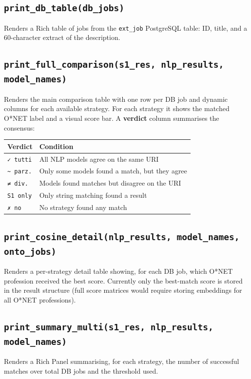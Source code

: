 ﻿\documentclass[12pt,a4paper]{article}
\begin{document}
\subsection{\texttt{print\_db\_table(db\_jobs)}}
Renders a Rich table of jobs from the \texttt{ext\_job} PostgreSQL table: ID, title, and a 60-character extract of the description.

\subsection{\texttt{print\_full\_comparison(s1\_res, nlp\_results, model\_names)}}
Renders the main comparison table with one row per DB job and dynamic columns for each available strategy. For each strategy it shows the matched O*NET label and a visual score bar. A \textbf{verdict} column summarises the consensus:

\begin{longtable}{@{}P{3cm}P{11.5cm}@{}}
\toprule
\textbf{Verdict} & \textbf{Condition} \\
\midrule
\endhead
\texttt{{\color{green}✓ tutti}} & All NLP models agree on the same URI \\
\texttt{{\color{yellow}\textasciitilde{} parz.}} & Only some models found a match, but they agree \\
\texttt{{\color{orange}≠ div.}} & Models found matches but disagree on the URI \\
\texttt{S1 only} & Only string matching found a result \\
\texttt{{\color{red}✗ no}} & No strategy found any match \\
\bottomrule
\end{longtable}

\subsection{\texttt{print\_cosine\_detail(nlp\_results, model\_names, onto\_jobs)}}
Renders a per-strategy detail table showing, for each DB job, which O*NET profession received the best score. Currently only the best-match score is stored in the result structure (full score matrices would require storing embeddings for all O*NET professions).

\subsection{\texttt{print\_summary\_multi(s1\_res, nlp\_results, model\_names)}}
Renders a Rich Panel summarising, for each strategy, the number of successful matches over total DB jobs and the threshold used.
\end{document}
